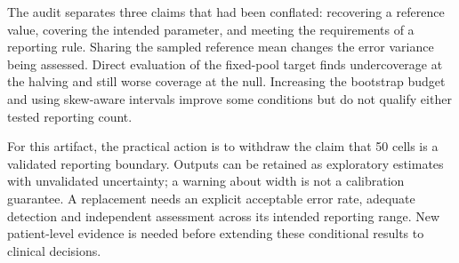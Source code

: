 The audit separates three claims that had been conflated: recovering a
reference value, covering the intended parameter, and meeting the requirements
of a reporting rule. Sharing the sampled reference mean changes the error
variance being assessed. Direct evaluation of the fixed-pool target finds
undercoverage at the halving and still worse coverage at the null.
Increasing the bootstrap budget and using skew-aware intervals improve some
conditions but do not qualify either tested reporting count.

For this artifact, the practical action is to withdraw the claim that 50 cells
is a validated reporting boundary. Outputs can be retained as exploratory
estimates with unvalidated uncertainty; a warning about width is not a
calibration guarantee. A replacement needs an explicit acceptable error rate,
adequate detection and independent assessment across its intended reporting
range. New patient-level evidence is needed before extending these conditional
results to clinical decisions.
